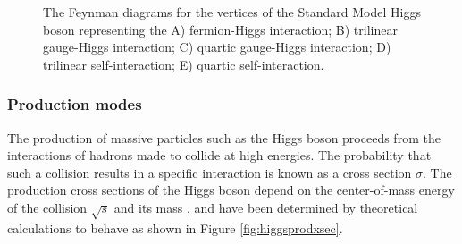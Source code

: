 \begin{figure}[htbp]
{     \qquad
  }
  \caption[Higgs Boson Interaction Vertices]{The Feynman diagrams for the vertices of the Standard Model Higgs boson representing the A) fermion-Higgs interaction; B) trilinear gauge-Higgs interaction; C) quartic gauge-Higgs interaction; D) trilinear self-interaction; E) quartic self-interaction.}
  \label{fig:higgsvertices}
\end{figure}
 
\subsubsection{Production modes} \label{productionmodes}

The production of massive particles such as the Higgs boson proceeds from the interactions of hadrons made to collide at high energies. The probability that such a collision results in a specific interaction is known as a cross section $\sigma$. The production cross sections of the Higgs boson depend on the center-of-mass energy of the collision $\sqrt{s}$ and its mass \massH, and have been determined by theoretical calculations to behave as shown in Figure \ref{fig:higgsprodxsec}.

